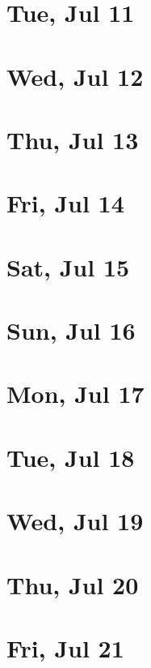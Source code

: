 	\section{Tue, Jul 11}
		
	\section{Wed, Jul 12}
		
	\section{Thu, Jul 13}
		
	\section{Fri, Jul 14}
		
	\section{Sat, Jul 15}
		
	\section{Sun, Jul 16}
		
	\section{Mon, Jul 17}
		
	\section{Tue, Jul 18}
		
	\section{Wed, Jul 19}
		
	\section{Thu, Jul 20}
		
	\section{Fri, Jul 21}
		
